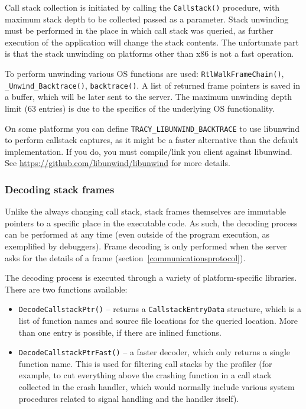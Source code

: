 \documentclass[hidelinks,titlepage,a4paper]{article}
\begin{document}
Call stack collection is initiated by calling the \texttt{Callstack()} procedure, with maximum stack depth to be collected passed as a parameter. Stack unwinding must be performed in the place in which call stack was queried, as further execution of the application will change the stack contents. The unfortunate part is that the stack unwinding on platforms other than x86 is not a fast operation.

To perform unwinding various OS functions are used: \texttt{RtlWalkFrameChain()}, \texttt{\_Unwind\_Backtrace()}, \texttt{backtrace()}. A list of returned frame pointers is saved in a buffer, which will be later sent to the server. The maximum unwinding depth limit (63 entries) is due to the specifics of the underlying OS functionality.

On some platforms you can define \texttt{TRACY\_LIBUNWIND\_BACKTRACE} to use libunwind to perform callstack captures, as it might be a faster alternative than the default implementation. If you do, you must compile/link you client against libunwind. See \url{https://github.com/libunwind/libunwind} for more details.

\subsubsection{Decoding stack frames}

Unlike the always changing call stack, stack frames themselves are immutable pointers to a specific place in the executable code. As such, the decoding process can be performed at any time (even outside of the program execution, as exemplified by debuggers). Frame decoding is only performed when the server asks for the details of a frame (section~\ref{communicationsprotocol}).

The decoding process is executed through a variety of platform-specific libraries. There are two functions available:

\begin{itemize}
\item \texttt{DecodeCallstackPtr()} -- returns a \texttt{CallstackEntryData} structure, which is a list of function names and source file locations for the queried location. More than one entry is possible, if there are inlined functions.
\item \texttt{DecodeCallstackPtrFast()} -- a faster decoder, which only returns a single function name. This is used for filtering call stacks by the profiler (for example, to cut everything above the crashing function in a call stack collected in the crash handler, which would normally include various system procedures related to signal handling and the handler itself).
\end{itemize}
\end{document}
